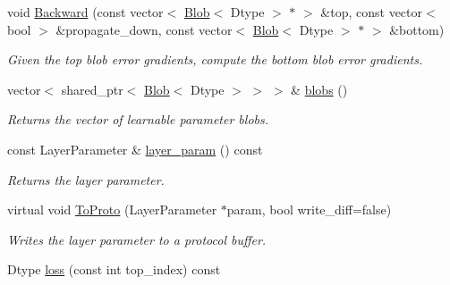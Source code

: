 \begin{DoxyCompactItemize}
void \hyperlink{classcaffe_1_1Layer_a53df1e081767e07bfb4c81657f4acd0a}{Backward} (const vector$<$ \hyperlink{classcaffe_1_1Blob}{Blob}$<$ Dtype $>$ $\ast$ $>$ \&top, const vector$<$ bool $>$ \&propagate\+\_\+down, const vector$<$ \hyperlink{classcaffe_1_1Blob}{Blob}$<$ Dtype $>$ $\ast$ $>$ \&bottom)
\begin{DoxyCompactList}\small\item\em Given the top blob error gradients, compute the bottom blob error gradients. \end{DoxyCompactList}\item 
vector$<$ shared\+\_\+ptr$<$ \hyperlink{classcaffe_1_1Blob}{Blob}$<$ Dtype $>$ $>$ $>$ \& \hyperlink{classcaffe_1_1Layer_aaf4524ce8641a30a8a4784aee1b2b4c8}{blobs} ()\hypertarget{classcaffe_1_1Layer_aaf4524ce8641a30a8a4784aee1b2b4c8}{}\label{classcaffe_1_1Layer_aaf4524ce8641a30a8a4784aee1b2b4c8}

\begin{DoxyCompactList}\small\item\em Returns the vector of learnable parameter blobs. \end{DoxyCompactList}\item 
const Layer\+Parameter \& \hyperlink{classcaffe_1_1Layer_af475062fe280614b18f642c4ccf50b40}{layer\+\_\+param} () const \hypertarget{classcaffe_1_1Layer_af475062fe280614b18f642c4ccf50b40}{}\label{classcaffe_1_1Layer_af475062fe280614b18f642c4ccf50b40}

\begin{DoxyCompactList}\small\item\em Returns the layer parameter. \end{DoxyCompactList}\item 
virtual void \hyperlink{classcaffe_1_1Layer_a4a1754828dda22cc8daa2f63377f3579}{To\+Proto} (Layer\+Parameter $\ast$param, bool write\+\_\+diff=false)\hypertarget{classcaffe_1_1Layer_a4a1754828dda22cc8daa2f63377f3579}{}\label{classcaffe_1_1Layer_a4a1754828dda22cc8daa2f63377f3579}

\begin{DoxyCompactList}\small\item\em Writes the layer parameter to a protocol buffer. \end{DoxyCompactList}\item 
Dtype \hyperlink{classcaffe_1_1Layer_a964ccba33b9a4b69391a72508f764eaf}{loss} (const int top\+\_\+index) const \hypertarget{classcaffe_1_1Layer_a964ccba33b9a4b69391a72508f764eaf}{}\label{classcaffe_1_1Layer_a964ccba33b9a4b69391a72508f764eaf}


\end{DoxyCompactItemize}
